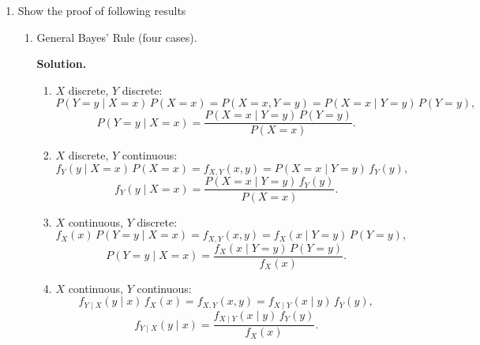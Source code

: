 \documentclass[11pt]{article}
\begin{document}
\begin{enumerate}[label=\arabic*., leftmargin=1.6em]
\newpage
\item Show the proof of following results
\begin{enumerate}
\item General Bayes' Rule (four cases).
\begin{center}
\end{center}

\textbf{Solution.}
\begin{enumerate}[label=(\roman*)]
\item \(X\) discrete, \(Y\) discrete:
\[
P(Y=y\mid X=x)\,P(X=x) = P(X=x,Y=y) = P(X=x\mid Y=y)\,P(Y=y),
\]
\[
P(Y=y\mid X=x) = \frac{P(X=x\mid Y=y)\,P(Y=y)}{P(X=x)}.
\]

\item \(X\) discrete, \(Y\) continuous:
\[
f_{Y}(y\mid X=x)\,P(X=x) = f_{X,Y}(x,y) = P(X=x\mid Y=y)\,f_{Y}(y),
\]
\[
f_{Y}(y\mid X=x) = \frac{P(X=x\mid Y=y)\,f_{Y}(y)}{P(X=x)}.
\]

\item \(X\) continuous, \(Y\) discrete:
\[
f_{X}(x)\,P(Y=y\mid X=x) = f_{X,Y}(x,y) = f_{X}(x\mid Y=y)\,P(Y=y),
\]
\[
P(Y=y\mid X=x) = \frac{f_{X}(x\mid Y=y)\,P(Y=y)}{f_{X}(x)}.
\]

\item \(X\) continuous, \(Y\) continuous:
\[
f_{Y\mid X}(y\mid x)\,f_{X}(x) = f_{X,Y}(x,y) = f_{X\mid Y}(x\mid y)\,f_{Y}(y),
\]
\[
f_{Y\mid X}(y\mid x) = \frac{f_{X\mid Y}(x\mid y)\,f_{Y}(y)}{f_{X}(x)}.
\]
\end{enumerate}


\end{enumerate}
\end{enumerate}
\end{document}
